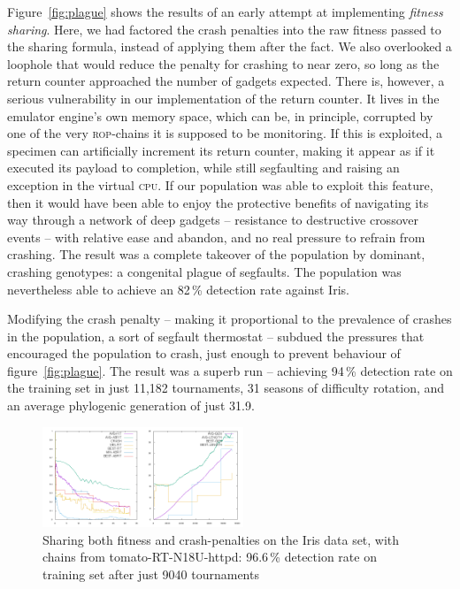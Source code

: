 Figure~\ref{fig:plague} shows the results of an early attempt at
implementing \textit{fitness sharing}. Here, we had factored the crash
penalties into the raw fitness passed to the sharing formula,
instead of applying them after the fact. We also overlooked a
loophole that would reduce the penalty for crashing to near zero,
so long as the return counter approached the number of gadgets
expected. There is, however, a serious vulnerability in our
implementation of the return counter. It lives in the emulator engine's
own memory space, which can be, in principle, corrupted by one of
the very \textsc{rop}-chains it is supposed to be monitoring. If
this is exploited, a specimen can artificially increment its
return counter, making it appear as if it executed its payload to
completion, while still segfaulting and raising an exception in
the virtual \textsc{cpu}. If our population was able to exploit
this feature, then it would have been able to enjoy the
protective benefits of navigating its way through a network of
deep gadgets -- resistance to destructive crossover events --
with relative ease and abandon, and no real pressure to refrain
from crashing. The result was a complete takeover of the
population by dominant, crashing genotypes: a congenital plague of
segfaults. The population was nevertheless able to achieve an 82\,\%
detection rate against Iris. 

Modifying the crash penalty -- making it proportional to the
prevalence of crashes in the population, a sort of segfault
thermostat -- subdued the
pressures that encouraged the population to crash, just enough to
prevent behaviour of figure~\ref{fig:plague}.
The result was a superb run -- achieving 94\,\% detection rate on
the training set in just 11,182 tournaments, 31 seasons of
difficulty rotation, and an average
phylogenic generation of just 31.9. 

\begin{figure}
  \includegraphics[width=\columnwidth,height=3cm]{examples/iris/sharing2/sharing2.png}
  \caption{Sharing both fitness and crash-penalties on the Iris
  data set, with chains from tomato-RT-N18U-httpd: 96.6\,\% detection rate on training set after just
  9040 tournaments}
  \label{fig:okay}
\end{figure}

